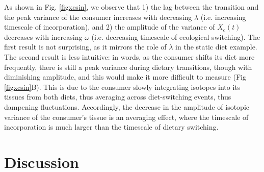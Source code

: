 \documentclass{article}
\begin{document}
As shown in Fig. \ref{figxcsin}, we observe that
1) the lag between the transition and the peak variance of the consumer increases with decreasing $\lambda$ (i.e. increasing timescale of incorporation), and
2) the amplitude of the variance of $X_c(t)$ decreases with increasing $\omega$ (i.e. decreasing timescale of ecological switching).
The first result is not surprising, as it mirrors the role of $\lambda$ in the static diet example. %
The second result is less intuitive: in words, as the consumer shifts its diet more frequently, there is still a peak variance during dietary transitions, though with diminishing amplitude, and this would make it more difficult to measure (Fig \ref{figxcsin}B).
This is due to the consumer slowly integrating isotopes into its tissues from both diets, thus averaging across diet-switching events, thus dampening fluctuations.
Accordingly, the decrease in the amplitude of isotopic variance of the consumer's tissue is an averaging effect, where the timescale of incorporation is much larger than the timescale of dietary switching.





\section{Discussion}

\end{document}
